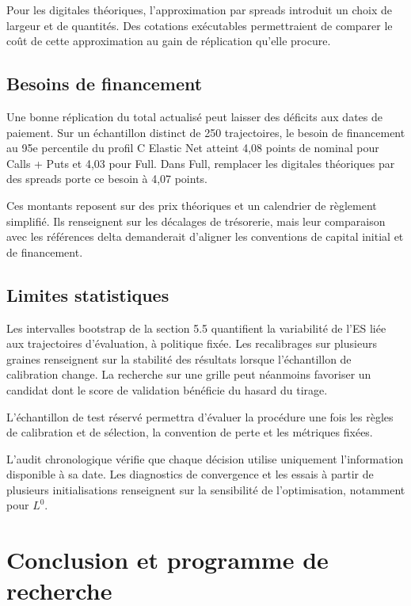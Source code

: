 \documentclass[12pt,a4paper]{article}
\newcommand{\1}{\mathbf{1}}
\begin{document}
Pour les digitales théoriques, l’approximation par spreads introduit un choix de largeur et de quantités. Des cotations exécutables permettraient de comparer le coût de cette approximation au gain de réplication qu’elle procure.

\subsection{Besoins de financement}

Une bonne réplication du total actualisé peut laisser des déficits aux dates de paiement. Sur un échantillon distinct de 250 trajectoires, le besoin de financement au 95e percentile du profil C Elastic Net atteint 4,08 points de nominal pour Calls + Puts et 4,03 pour Full. Dans Full, remplacer les digitales théoriques par des spreads porte ce besoin à 4,07 points.

Ces montants reposent sur des prix théoriques et un calendrier de règlement simplifié. Ils renseignent sur les décalages de trésorerie, mais leur comparaison avec les références delta demanderait d’aligner les conventions de capital initial et de financement.

\subsection{Limites statistiques}

Les intervalles bootstrap de la section 5.5 quantifient la variabilité de l’ES liée aux trajectoires d’évaluation, à politique fixée. Les recalibrages sur plusieurs graines renseignent sur la stabilité des résultats lorsque l’échantillon de calibration change. La recherche sur une grille peut néanmoins favoriser un candidat dont le score de validation bénéficie du hasard du tirage.

L’échantillon de test réservé permettra d’évaluer la procédure une fois les règles de calibration et de sélection, la convention de perte et les métriques fixées.

L’audit chronologique vérifie que chaque décision utilise uniquement l’information disponible à sa date. Les diagnostics de convergence et les essais à partir de plusieurs initialisations renseignent sur la sensibilité de l’optimisation, notamment pour $L^0$.

\section{Conclusion et programme de recherche}
\end{document}
